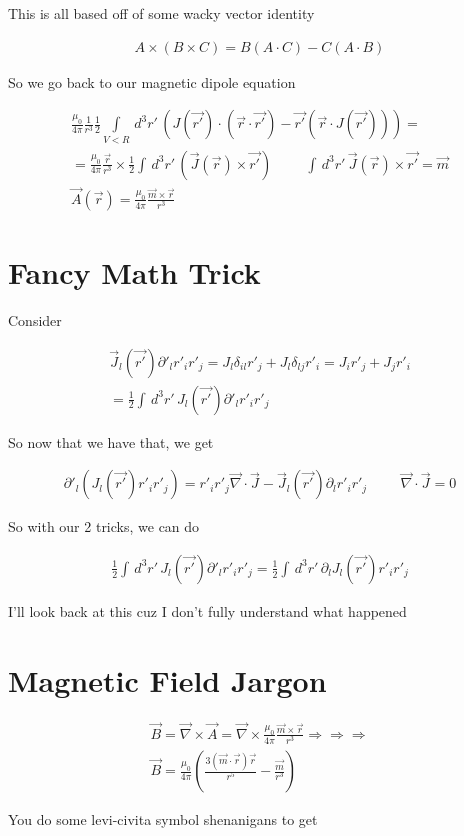 \documentclass[fleqn]{report}
\newcommand{\hp}{\hspace{1cm}}
\newcommand{\del}{\partial}
\newcommand{\equations} [1] {
\begin{gather*}
#1
\end{gather*}
}
\begin{document}
This is all based off of some wacky vector identity 
\equations{
    A \times (B \times C)
    =
    B (A \cdot C) - C(A \cdot B)
}

So we go back to our magnetic dipole equation 
\equations{
    \frac{\mu_0}{4 \pi}
    \frac{1}{r^3}
    \frac{1}{2}
    \int\limits_{V < R} \, d^3 r' \, 
    \left(
        J(\vec{r'}) \cdot (\vec r \cdot \vec{r'}) 
        - 
        \vec{r'} (\vec r \cdot J(\vec{r'}))
    \right)
    =
    \\
    =
    \frac{\mu_0}{4 \pi}
    \frac{\vec r}{r^3}
    \times 
    \frac{1}{2}
    \int \, d^3 r' \, 
    \left(
        \vec J(\vec r) \times \vec{r'}
    \right)
    \hp 
    \int \, d^3 r' \, 
    \vec J(\vec r) \times \vec{r'}
    =
    \vec m
    \\ 
    \vec A(\vec r) = \frac{\mu_0}{4 \pi} \frac{\vec m \times \vec r}{r^3}
}

\section{Fancy Math Trick}
Consider 

\equations{
    \vec J_l(\vec{r'}) \del'_l r'_i r'_j 
    =
    J_l \delta_{il} r'_j + J_l \delta_{lj} r'_i
    =
    J_i r'_j + J_j r'_i
    \\
    =
    \frac{1}{2}
    \int \, d^3 r' \, 
    J_l(\vec{r'}) \del'_l r'_i r'_j
}

So now that we have that, we get 
\equations{
    \del'_l \left( J_l(\vec{r'}) r'_i r'_j \right)
    =
    r'_i r'_j \vec \nabla \cdot \vec J - \vec J_l(\vec{r'}) \del_l r'_i r'_j
    \hp 
    \vec \nabla \cdot \vec J = 0
}

So with our 2 tricks, we can do 
\equations{
    \frac{1}{2}
    \int \, d^3 r' \, 
    J_l(\vec{r'}) \del'_l r'_i r'_j
    =
    \frac{1}{2}
    \int \, d^3 r' \, 
    \del_l J_l(\vec{r'}) r'_i r'_j
}
I'll look back at this cuz I don't fully understand what happened

\section{Magnetic Field Jargon}
\equations{
    \vec B = \vec \nabla \times \vec A 
    =
    \vec \nabla \times \frac{\mu_0}{4 \pi} \frac{\vec m \times \vec r}{r^3}
    \Rightarrow 
    \Rightarrow 
    \Rightarrow 
    \\
    \vec B 
    =
    \frac{\mu_0}{4 \pi}
    \left(
        \frac{3 (\vec m \cdot \vec r) \vec r}{r^5} 
        -
        \frac{\vec m}{r^3}
    \right)
}
You do some levi-civita symbol shenanigans to get 
\end{document}
